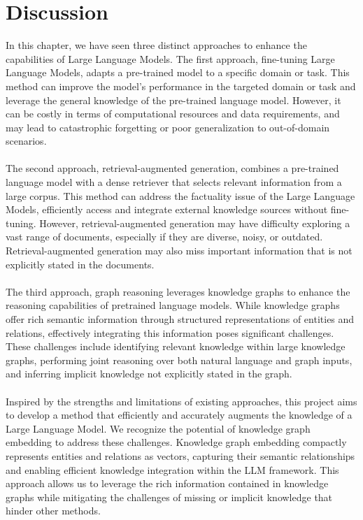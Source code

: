 \section{Discussion}
In this chapter, we have seen three distinct approaches to enhance the capabilities of Large Language Models. The first approach, fine-tuning Large Language Models, adapts a pre-trained model to a specific domain or task. This method can improve the model's performance in the targeted domain or task and leverage the general knowledge of the pre-trained language model. However, it can be costly in terms of computational resources and data requirements, and may lead to catastrophic forgetting or poor generalization to out-of-domain scenarios.\\\\
The second approach, retrieval-augmented generation, combines a pre-trained language model with a dense retriever that selects relevant information from a large corpus. This method can address the factuality issue of the Large Language Models, efficiently access and integrate external knowledge sources without fine-tuning. However, retrieval-augmented generation may have difficulty exploring a vast range of documents, especially if they are diverse, noisy, or outdated. Retrieval-augmented generation may also miss important information that is not explicitly stated in the documents.\\\\
The third approach, graph reasoning leverages knowledge graphs to enhance the reasoning capabilities of pretrained language models. While knowledge graphs offer rich semantic information through structured representations of entities and relations, effectively integrating this information poses significant challenges. These challenges include identifying relevant knowledge within large knowledge graphs, performing joint reasoning over both natural language and graph inputs, and inferring implicit knowledge not explicitly stated in the graph.\\\\
Inspired by the strengths and limitations of existing approaches, this project aims to develop a method that efficiently and accurately augments the knowledge of a Large Language Model. We recognize the potential of knowledge graph embedding to address these challenges. Knowledge graph embedding compactly represents entities and relations as vectors, capturing their semantic relationships and enabling efficient knowledge integration within the LLM framework. This approach allows us to leverage the rich information contained in knowledge graphs while mitigating the challenges of missing or implicit knowledge that hinder other methods.
